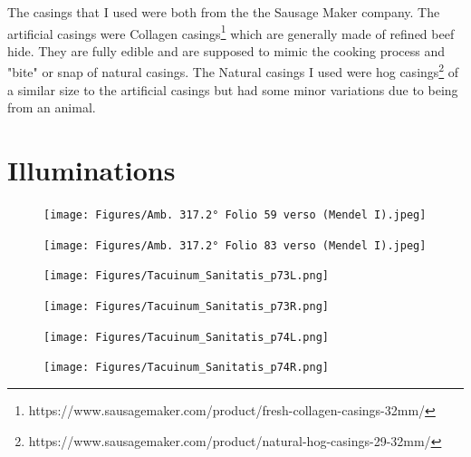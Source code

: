 \documentclass[letterpaper,11pt,leqno]{article}
\begin{document}
The casings that I used were both from the the Sausage Maker company. The artificial casings were Collagen casings\footnote{https://www.sausagemaker.com/product/fresh-collagen-casings-32mm/} which are generally made of refined beef hide. They are fully edible and are supposed to mimic the cooking process and "bite" or snap of natural casings. The Natural casings I used were hog casings\footnote{https://www.sausagemaker.com/product/natural-hog-casings-29-32mm/} of a similar size to the artificial casings but had some minor variations due to being from an animal.

\FloatBarrier



\FloatBarrier

\section{Illuminations}\label{b:appendix2}

\begin{figure}[!htb]
	\centering
	\texttt{[image: Figures/Amb. 317.2° Folio 59 verso (Mendel I).jpeg]}
	\caption{\citep[page 59 Left]{Mendel}}
\end{figure}

\begin{figure}[!htb]
	\centering
	\texttt{[image: Figures/Amb. 317.2° Folio 83 verso (Mendel I).jpeg]}
	\caption{\citep[page 83 Left]{Mendel}}
\end{figure}

\begin{figure}[!htb]
	\centering
	\texttt{[image: Figures/Tacuinum\_Sanitatis\_p73L.png]}
	\caption{\citep[page 73 Left]{TacSan}}
\end{figure}

\begin{figure}[!htb]
	\centering
	\texttt{[image: Figures/Tacuinum\_Sanitatis\_p73R.png]}
	\caption{\citep[page 73 Right]{TacSan}}
\end{figure}

\begin{figure}[!htb]
	\centering
	\texttt{[image: Figures/Tacuinum\_Sanitatis\_p74L.png]}
	\caption{\citep[page 74 Left]{TacSan}}
\end{figure}

\begin{figure}[!htb]
	\centering
	\texttt{[image: Figures/Tacuinum\_Sanitatis\_p74R.png]}
	\caption{\citep[page 74 Right]{TacSan}}
\end{figure}
\end{document}
